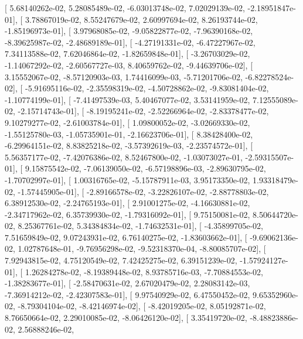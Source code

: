 \documentclass{article}
\begin{document}
       [  5.68140262e-02,   5.28085489e-02,  -6.03013748e-02,
          7.02029139e-02,  -2.18951847e-01],
       [  3.78867019e-02,   8.55247679e-02,   2.60997694e-02,
          8.26193744e-02,  -1.85196973e-01],
       [  3.97968085e-02,  -9.05822877e-02,  -7.96390168e-02,
         -8.39625987e-02,  -2.48689189e-01],
       [ -4.27191331e-02,  -6.47227967e-02,   7.34113588e-02,
          7.62046864e-02,  -1.82659848e-01],
       [ -3.26703029e-02,  -1.14067292e-02,  -2.60567727e-03,
          8.40659762e-02,  -9.44639706e-02],
       [  3.15552067e-02,  -8.57120903e-03,   1.74416099e-03,
         -5.71201706e-02,  -6.82278524e-02],
       [ -5.91695116e-02,  -2.35598319e-02,  -4.50728862e-02,
         -9.83081404e-02,  -1.10774199e-01],
       [ -7.41497539e-03,   5.40467077e-02,   3.53141959e-02,
          7.12555089e-02,  -2.15714743e-01],
       [ -8.19195241e-02,  -2.52266964e-02,  -2.83378477e-02,
          9.10279277e-02,  -2.61003784e-01],
       [  1.09800052e-02,  -3.02669330e-02,  -1.55125780e-03,
         -1.05735901e-01,  -2.16623706e-01],
       [  8.38428400e-02,  -6.29964151e-02,   8.83825218e-02,
         -3.57392619e-03,  -2.23574572e-01],
       [  5.56357177e-02,  -7.42076386e-02,   8.52467800e-02,
         -1.03073027e-01,  -2.59315507e-01],
       [  9.15875542e-02,  -7.06139050e-02,  -6.57198896e-03,
         -2.89630795e-02,  -1.70702997e-01],
       [  1.00316765e-02,  -5.15787911e-03,   3.95173350e-02,
          1.93318479e-02,  -1.57445905e-01],
       [ -2.89166578e-02,  -3.22826107e-02,  -2.88778803e-02,
          6.38912530e-02,  -2.24765193e-01],
       [  2.91001275e-02,  -4.16630881e-02,  -2.34717962e-02,
          6.35739930e-02,  -1.79316092e-01],
       [  9.75150081e-02,   8.50644720e-02,   8.25367761e-02,
          5.34384834e-02,  -1.74632531e-01],
       [ -4.35899705e-02,   7.51659849e-02,   9.07243931e-02,
          6.76140275e-02,  -1.83603662e-01],
       [ -9.69062136e-02,   1.02787648e-01,  -9.76956298e-02,
         -9.52318370e-04,  -8.80085707e-02],
       [  7.92943815e-02,   4.75120549e-02,   7.42425275e-02,
          6.39151239e-02,  -1.57924127e-01],
       [  1.26284278e-02,  -8.19389448e-02,   8.93785716e-03,
         -7.70884553e-02,  -1.38283677e-01],
       [ -2.58470631e-02,   2.67020479e-02,   2.28083142e-03,
         -7.36914212e-02,  -2.42307583e-01],
       [  9.97540929e-02,   6.47550452e-02,   9.65352960e-02,
         -8.79304104e-02,  -8.42146974e-02],
       [ -8.42019205e-02,   8.05192871e-02,   8.76650664e-02,
          2.29010085e-02,  -8.06426120e-02],
       [  3.35419720e-02,  -8.48823886e-02,   2.56888246e-02,
\end{document}
